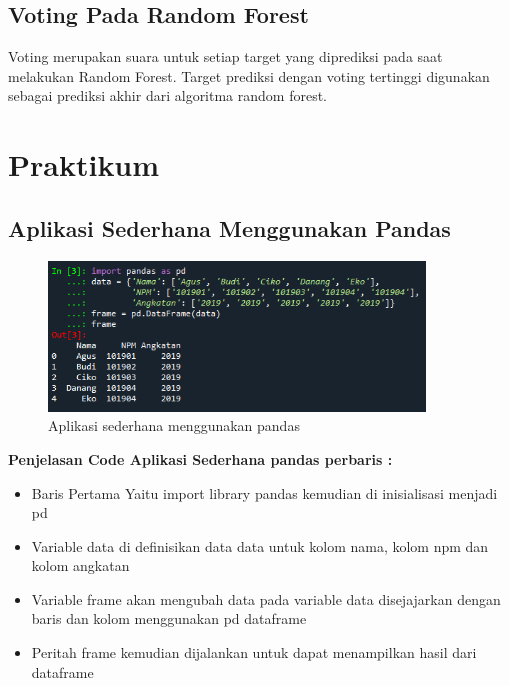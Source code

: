 \subsection{Voting Pada Random Forest}
Voting merupakan suara untuk setiap target yang diprediksi pada saat melakukan Random Forest. Target prediksi dengan voting tertinggi digunakan sebagai prediksi akhir dari algoritma random forest.

\section{Praktikum}
\subsection{Aplikasi Sederhana Menggunakan Pandas}
\begin{figure}[!htbp]
	\centering
	\includegraphics[width=10cm,height=4cm]{figures/aplikasi_pandas.png}
	\caption{Aplikasi sederhana menggunakan pandas}
	\label{penanda}
\end{figure}
    \textbf{Penjelasan Code Aplikasi Sederhana pandas perbaris :}
    \begin{itemize}
    \item Baris Pertama Yaitu import library pandas kemudian di inisialisasi menjadi pd
    \item Variable data di definisikan data data untuk kolom nama, kolom npm dan kolom angkatan
    \item Variable frame akan mengubah data pada variable data disejajarkan dengan baris dan kolom menggunakan pd dataframe
    \item Peritah frame kemudian dijalankan untuk dapat menampilkan hasil dari dataframe
    \end{itemize}

